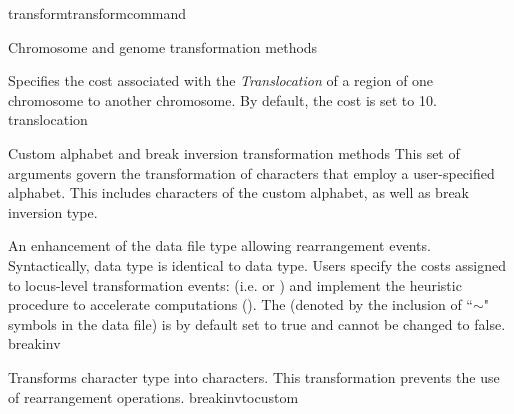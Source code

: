 \begin{command}{transform}{transformcommand}
\begin{arguments}
\begin{argumentgroup}{Chromosome and genome transformation methods}
\begin{description}
{Specifies the cost associated with the \emph{Translocation} of a region of one 
chromosome to another chromosome. By default, the cost is set to 10.}
{translocation}

\end{description}
\end{argumentgroup}


\begin{argumentgroup}{Custom alphabet and break inversion transformation methods}  
This set of arguments govern the transformation of characters that employ a user-specified alphabet.
This includes characters of the custom alphabet, as well as break inversion type.

 {An enhancement
 of the data file type  allowing
rearrangement events. Syntactically,  data type is identical to 
 data type. Users specify 
the costs assigned to locus-level transformation events: (i.e. 
 or ) 
and implement the heuristic procedure to accelerate computations 
().  The  (denoted by the 
inclusion of ``$\sim$" symbols in the data file) is by default set to true
and cannot be changed to false.} 
{breakinv}

{Transforms  character type into  characters.
This transformation prevents the use of rearrangement operations.}
{breakinvtocustom}



\end{argumentgroup}
\end{arguments}
\end{command}
